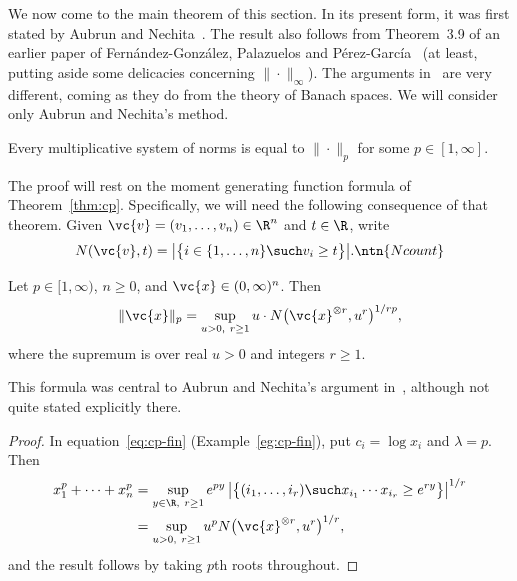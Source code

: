 We now come to the main theorem of this section.  In its present form, it
was first stated by Aubrun and Nechita~\cite{AuNe}.  The result also
follows from Theorem~3.9 of an earlier paper of Fern\'andez-Gonz\'alez,%
%
% 
Palazuelos%
%
%
and P\'erez-Garc\'{i}a~\cite{FGPPG}%
%
% 
(at least, putting aside some delicacies concerning $\|\cdot\|_\infty$).
The arguments in~\cite{FGPPG} are very different, coming as they do from
the theory of Banach spaces.  We will consider only Aubrun and Nechita's
method.

\begin{thm}
% 
Every multiplicative system of norms is equal to $\|\cdot\|_p$ for some $p
\in [1, \infty]$.    
\end{thm}

The proof will rest on the moment generating function formula of
Theorem~\ref{thm:cp}.  Specifically, we will need the following consequence
of that theorem. 
% 
Given $\vc{v} = (v_1, \ldots, v_n) \in \R^n$ and $t \in \R$, write
\[
N(\vc{v}, t) 
=
\bigl|\bigl\{ 
i \in \{1, \ldots, n\} 
\such
v_i \geq t
\bigr\}\bigr|.
\ntn{Ncount}
\]

\begin{propn}
%
%
%
%
Let $p \in [1, \infty)$, $n \geq 0$, and $\vc{x} \in (0, \infty)^n$.  Then
\[
\|\vc{x}\|_p
=
\sup_{u > 0, \ r \geq 1} 
u \cdot N\bigl(\vc{x}^{\otimes r}, u^r\bigr)^{1/rp},
\]
where the supremum is over real $u > 0$ and integers $r \geq 1$.
\end{propn}

This formula was central to Aubrun and Nechita's argument in~\cite{AuNe},
although not quite stated explicitly there.

\begin{proof}
In equation~\eqref{eq:cp-fin} (Example~\ref{eg:cp-fin}), put $c_i = \log x_i$
and $\lambda = p$.  Then
% 
\begin{align*}
x_1^p + \cdots + x_n^p  &
=
\sup_{y \in \R, \ r \geq 1} 
e^{py} \, 
\bigl|\bigl\{
(i_1, \ldots, i_r) \such x_{i_1} \cdots x_{i_r} \geq e^{ry}
\bigr\}\bigr|^{1/r}     \\
&
=
\sup_{u > 0, \ r \geq 1} u^p 
N\bigl(\vc{x}^{\otimes r}, u^r\bigr)^{1/r},
\end{align*}
% 
and the result follows by taking $p$th roots throughout.
\end{proof}

